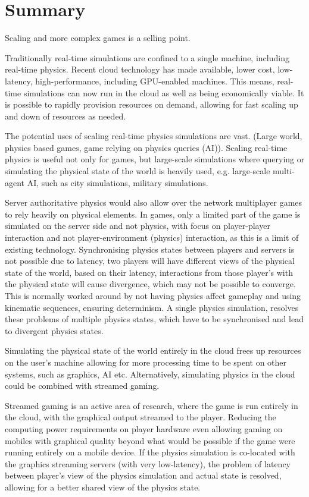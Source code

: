 \section{Summary}
Scaling and more complex games is a selling point.

Traditionally real-time simulations are confined to a single machine, including real-time physics. 
Recent cloud technology has made available, lower cost, low-latency, high-performance, including GPU-enabled machines. This means, real-time simulations can now run in the cloud as well as being economically viable. It is possible to rapidly provision resources on demand, allowing for fast scaling up and down of resources as needed.

The potential uses of scaling real-time physics simulations are vast. (Large world, physics based games, game relying on physics queries (AI)). Scaling real-time physics is useful not only for games, but large-scale simulations where querying or simulating the physical state of the world is heavily used, e.g. large-scale multi-agent AI, such as city simulations, military simulations. 

Server authoritative physics would also allow over the network multiplayer games to rely heavily on physical elements. In games, only a limited part of the game is simulated on the server side and not physics, with focus on player-player interaction and not player-environment (physics) interaction, as this is a limit of existing technology. 
Synchronising physics states between players and servers is not possible due to latency, two players will have different views of the physical state of the world, based on their latency, interactions from those player's with the physical state will cause divergence, which may not be possible to converge. This is normally worked around by not having physics affect gameplay and using kinematic sequences, ensuring determinism. A single physics simulation, resolves these problems of multiple physics states, which have to be synchronised and lead to divergent physics states. 

Simulating the physical state of the world entirely in the cloud frees up resources on the user's machine allowing for more processing time to be spent on other systems, such as graphics, AI etc. Alternatively, simulating physics in the cloud could be combined with streamed gaming.

Streamed gaming is an active area of research, where the game is run entirely in the cloud, with the graphical output streamed to the player. Reducing the computing power requirements on player hardware even allowing gaming on mobiles with graphical quality beyond what would be possible if the game were running entirely on a mobile device.  If the physics simulation is co-located with the graphics streaming servers (with very low-latency), the problem of latency between player's view of the physics simulation and actual state is resolved, allowing for a better shared view of the physics state.

